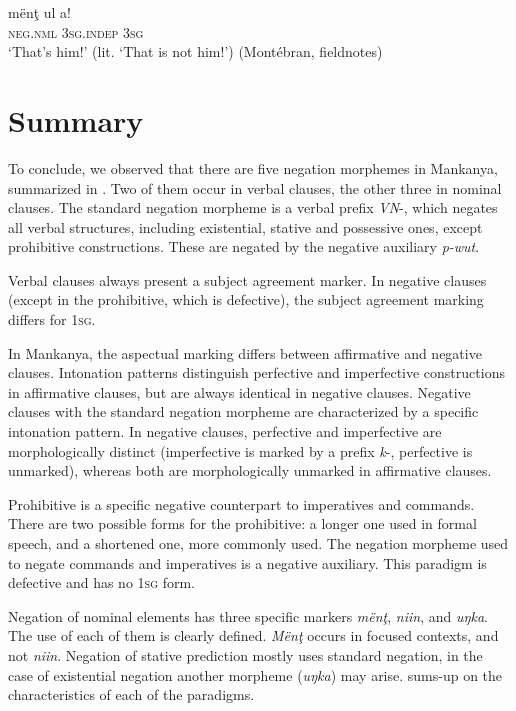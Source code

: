 \documentclass[output=paper,colorlinks,citecolor=brown]{langscibook}
\begin{document}
\ea\label{ex:mank:71}
    \gll mënţ ul a!\\
         \textsc{neg.nml} \textsc{3sg.indep} \textsc{3sg}\\
    \glt ‘That’s him!’ (lit. ‘That is not him!’) (Montébran, fieldnotes)
\z

\section{Summary}\label{sec:mank:5}
\largerpage
To conclude, we observed that there are five negation morphemes in Mankanya, summarized in . Two of them occur in verbal clauses, the other three in nominal clauses.
The standard negation morpheme is a verbal prefix \textit{VN}{}-, which negates all verbal structures, including existential, stative and possessive ones, except prohibitive constructions. These are negated by the negative auxiliary \textit{p-wut}. 

Verbal clauses always present a subject agreement marker. In negative clauses (except in the prohibitive, which is defective), the subject agreement marking differs for \textsc{1sg}. 

In Mankanya, the aspectual marking differs between affirmative and negative clauses. Intonation patterns distinguish perfective and imperfective constructions in affirmative clauses, but are always identical in negative clauses. Negative clauses with the standard negation morpheme are characterized by a specific intonation pattern. In negative clauses, perfective and imperfective are morphologically distinct (imperfective is marked by a prefix \textit{k}{}-, perfective is unmarked), whereas both are morphologically unmarked in affirmative clauses. 

 Prohibitive is a specific negative counterpart to imperatives and commands. There are two possible forms for the prohibitive: a longer one used in formal speech, and a shortened one, more commonly used. The negation morpheme used to negate commands and imperatives is a negative auxiliary. This paradigm is defective and has no \textsc{1sg} form.

Negation of nominal elements has three specific markers \textit{mënţ}, \textit{niin}, and \textit{uŋka}. The use of each of them is clearly defined. \textit{Mënţ} occurs in focused contexts, and not \textit{niin}. Negation of stative prediction mostly uses standard negation, in the case of existential negation another morpheme (\textit{uŋka}) may arise.  sums-up on the characteristics of each of the paradigms.
\end{document}
